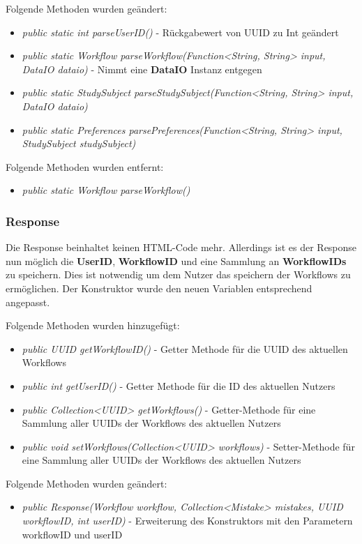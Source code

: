 \documentclass[parskip=full]{scrartcl}
\begin{document}
				Folgende Methoden wurden geändert:
				\begin{itemize}
					\item \textit{public static int parseUserID()} - Rückgabewert von UUID zu Int geändert
					\item \textit{public static Workflow parseWorkflow(Function<String, String> input, DataIO dataio)} - Nimmt eine \textbf{DataIO} Instanz entgegen
					\item \textit{public static StudySubject parseStudySubject(Function<String, String> input, DataIO dataio)}
					\item \textit{public static Preferences parsePreferences(Function<String, String> input, StudySubject studySubject)}
				\end{itemize}
			
				Folgende Methoden wurden entfernt:
				\begin{itemize}
					\item \textit{public static Workflow parseWorkflow()}
				\end{itemize}
		 
			\subsubsection{Response}
				Die Response beinhaltet keinen HTML-Code mehr. Allerdings ist es der Response nun möglich die \textbf{UserID}, \textbf{WorkflowID} und eine Sammlung an \textbf{WorkflowIDs} zu speichern. Dies ist notwendig um dem Nutzer das speichern der Workflows zu ermöglichen. Der Konstruktor wurde den neuen Variablen entsprechend angepasst.
				
				Folgende Methoden wurden hinzugefügt:
				\begin{itemize}
					\item \textit{public UUID getWorkflowID()} - Getter Methode für die UUID des aktuellen Workflows
					\item \textit{public int getUserID()} - Getter Methode für die ID des aktuellen Nutzers
					\item \textit{public Collection<UUID> getWorkflows()} - Getter-Methode für eine Sammlung aller UUIDs der Workflows des aktuellen Nutzers
					\item \textit{public void setWorkflows(Collection<UUID> workflows)} - Setter-Methode für eine Sammlung aller UUIDs der Workflows des aktuellen Nutzers	
				\end{itemize}
			
				Folgende Methoden wurden geändert:
				\begin{itemize}
					\item \textit{public Response(Workflow workflow, Collection<Mistake> mistakes, UUID workflowID, int userID)} - Erweiterung des Konstruktors mit den Parametern workflowID und userID
				\end{itemize}
			
\end{document}
